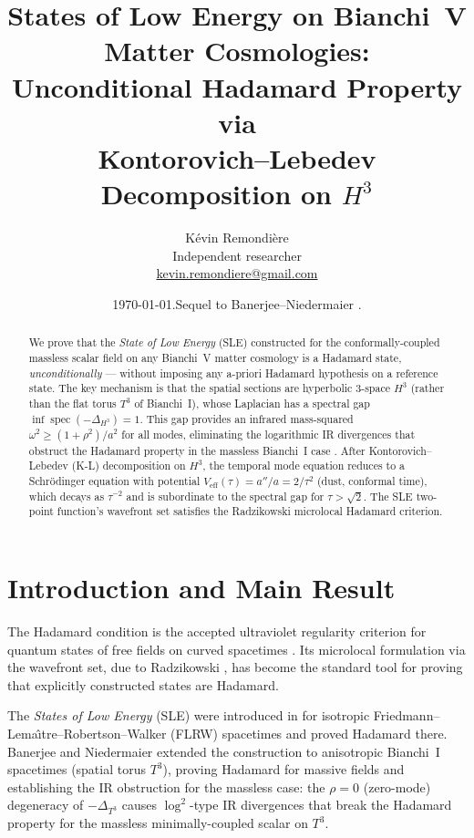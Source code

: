 \documentclass[12pt,letterpaper]{article}
\title{States of Low Energy on Bianchi~V Matter Cosmologies:\\
Unconditional Hadamard Property via\\
Kontorovich--Lebedev Decomposition on $H^3$}
\author{K\'evin Remondi\`ere\\
\small Independent researcher\\
\small \href{mailto:kevin.remondiere@gmail.com}{kevin.remondiere@gmail.com}}
\date{\today.\quad Sequel to Banerjee--Niedermaier \cite{BN23}.}
\DeclareMathOperator{\spec}{spec}
\begin{document}
\maketitle

\begin{abstract}
We prove that the \emph{State of Low Energy} (SLE) constructed for the
conformally-coupled massless scalar field on any Bianchi~V matter
cosmology is a Hadamard state, \emph{unconditionally} --- without imposing
any a-priori Hadamard hypothesis on a reference state.
The key mechanism is that the spatial sections are hyperbolic $3$-space
$H^3$ (rather than the flat torus $T^3$ of Bianchi~I), whose Laplacian
has a spectral gap $\inf\spec(-\Delta_{H^3})=1$.
This gap provides an infrared mass-squared $\omega^2 \geq (1 + \rho^2)/a^2$
for all modes, eliminating the logarithmic IR divergences that obstruct
the Hadamard property in the massless Bianchi~I case
\cite{BN23}.
After Kontorovich--Lebedev (K-L) decomposition on $H^3$, the temporal mode
equation reduces to a Schr\"{o}dinger equation with potential
$V_{\mathrm{eff}}(\tau) = a''/a = 2/\tau^2$ (dust, conformal time), which
decays as $\tau^{-2}$ and is subordinate to the spectral gap for
$\tau > \sqrt{2}$.
The SLE two-point function's wavefront set satisfies the Radzikowski
microlocal Hadamard criterion.
\end{abstract}

\section{Introduction and Main Result}
\label{sec:intro}

The Hadamard condition is the accepted ultraviolet regularity criterion for
quantum states of free fields on curved spacetimes \cite{Wald94}.
Its microlocal formulation via the wavefront set, due to Radzikowski
\cite{Radzikowski96}, has become the standard tool for proving that
explicitly constructed states are Hadamard.

The \emph{States of Low Energy} (SLE) were introduced in
\cite{Olbermann07} for isotropic Friedmann--Lema\^{\i}tre--Robertson--Walker
(FLRW) spacetimes and proved Hadamard there.
Banerjee and Niedermaier \cite{BN23} extended the construction to anisotropic
Bianchi~I spacetimes (spatial torus $T^3$), proving Hadamard for massive
fields and establishing the IR obstruction for the massless case:
the $\rho=0$ (zero-mode) degeneracy of $-\Delta_{T^3}$ causes
$\log^2$-type IR divergences that break the Hadamard property for the
massless minimally-coupled scalar on $T^3$.
\end{document}
